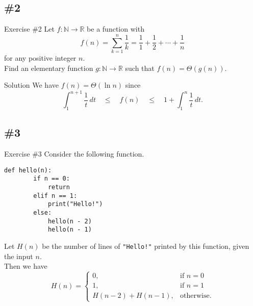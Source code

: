 \documentclass{beamer}
\begin{document}
\subsection{\#2}
\begin{frame}{Exercise \#2}
  Let $f: \mathbb{N} \to \mathbb{R}$ be a function with
  \begin{equation*}
    f(n) = \sum_{k=1}^n \frac{1}{k}
    = \frac{1}{1} + \frac{1}{2} + \cdots + \frac{1}{n}
  \end{equation*}
  for any positive integer $n$. \pause \\[.5em]
  Find an elementary function $g: \mathbb{N} \to \mathbb{R}$ such that
  $f(n) = \Theta(g(n))$. \pause
  \begin{block}{Solution}
    We have $f(n) = \Theta(\ln n)$ since
    \begin{equation*}
      \int_1^{n+1} \frac{1}{t}\,dt
      \quad \leq \quad f(n)
      \quad \leq \quad 1 + \int_1^n \frac{1}{t}\,dt.
    \end{equation*}
  \end{block}
\end{frame}

\subsection{\#3}
\begin{frame}[fragile]{Exercise \#3}
  Consider the following function.
  \begin{block}{}
    \scriptsize
    \begin{lstlisting}[gobble=4]
    def hello(n):
        if n == 0:
            return
        elif n == 1:
            print("Hello!")
        else:
            hello(n - 2)
            hello(n - 1)
    \end{lstlisting}
    \pause
  \end{block}
  Let $H(n)$ be the number of lines of \lstinline{"Hello!"} printed by this
  function, given the input $n$. \pause \\[.5em]
  Then we have
  \begin{equation*}
    H(n) =
    \begin{cases}
      0, & \text{if $n = 0$} \\
      1, & \text{if $n = 1$} \\
      H(n-2) + H(n-1), & \text{otherwise}.
    \end{cases}
  \end{equation*}
\end{frame}
\end{document}
